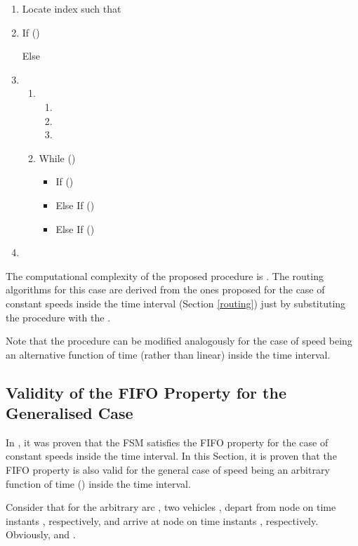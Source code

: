 \documentclass[conference]{IEEEtran}
\begin{document}
\begin{enumerate}
    \item Locate index  such that  \label{fattindex}
    \item If () 
    


    Else 
    \item
    \begin{enumerate}
        \item 
        \begin{enumerate}
            \item 
            \item 
            \item 
        \end{enumerate} 
        \item While ()   \label{fattwhile}
        \begin{itemize}
            \item If () 
            \item Else If () 
            \item Else If ()  
        \end{itemize}
    \end{enumerate}
    \item 
    
 
\end{enumerate}

The computational complexity of the proposed  procedure is . The routing algorithms for this case are derived from the ones proposed for the case of constant speeds inside the time interval (Section \ref{routing}) just by substituting the  procedure with the .

Note that the  procedure can be modified analogously for the case of speed being an alternative function of time (rather than linear) inside the time interval.  

\subsection{Validity of the FIFO Property for the Generalised Case}

In \cite{Sung}, it was proven that the FSM satisfies the FIFO property for the case of constant speeds inside the time interval. In this Section, it is proven that the FIFO property is also valid for the general case of speed being an arbitrary function of time () inside the time interval.

Consider that for the arbitrary arc , two vehicles ,  depart from node  on time instants ,  respectively, and arrive at node  on time instants ,  respectively. Obviously,   and . 
\end{document}

